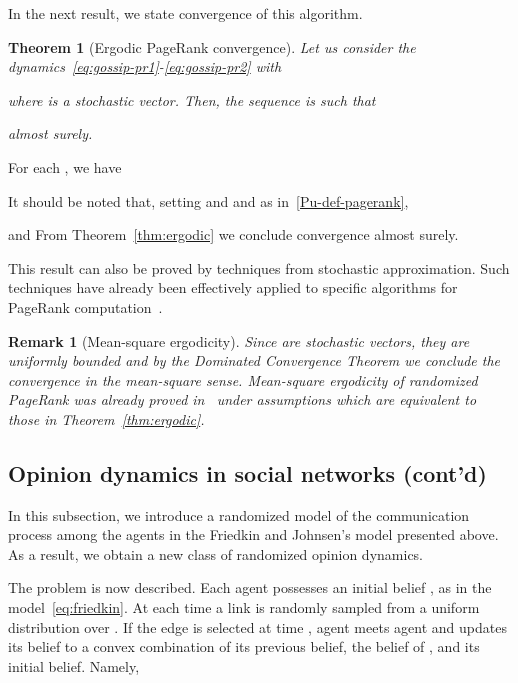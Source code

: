 \documentclass{IEEEtran}
\newtheorem{theorem}{Theorem}
\newtheorem{remark}{Remark}
\newcommand{\1}{\mathbf{1}} \newcommand{\ind}{\mathds{1}}
\begin{document}
In the next result, we state convergence of this algorithm.
\begin{theorem}[Ergodic PageRank convergence]
\label{cor:pagerank}
Let us consider the dynamics~\eqref{eq:gossip-pr1}-\eqref{eq:gossip-pr2} with 
 
where  is a stochastic vector. Then, the
sequence  
is such that 

almost surely. 
\end{theorem}

\begin{IEEEproof}
For each , we have

It should be noted that, setting  and  and  as in~\eqref{Pu-def-pagerank},

and 
From Theorem~\ref{thm:ergodic} we conclude convergence almost surely. 
\end{IEEEproof}

This result can also be proved by techniques from stochastic approximation. Such techniques have already been effectively applied to specific algorithms for PageRank computation~\cite{DBLP:journals/corr/abs-1305-3178}. 

\begin{remark}[Mean-square ergodicity]\label{rem:ms-pgr}
Since  are stochastic vectors, they are uniformly bounded and by the Dominated Convergence Theorem we conclude the convergence in the mean-square sense. Mean-square ergodicity of randomized PageRank was already proved in~\cite{HI-RT-EWB-FD:09} under assumptions which are equivalent to those in Theorem~\ref{thm:ergodic}.
\end{remark}




\subsection{Opinion dynamics in social networks (cont'd)}
\label{sect:random-friedkin}
In this subsection, we introduce a randomized model of the communication process among the agents in the Friedkin and Johnsen's model presented above. As a result, we obtain a new class of randomized opinion dynamics.

The problem is now described.
Each agent  possesses an initial belief , as in the model~\eqref{eq:friedkin}. At each time  a link is randomly sampled from a uniform distribution over . If the edge  is selected at time , agent  meets agent  and updates its belief to a convex combination of its previous belief, the belief of , and its initial belief. Namely, 
\end{document}
